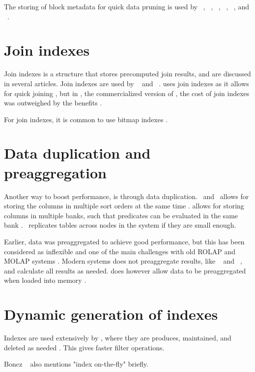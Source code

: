 The storing of block metadata for quick data pruning is used by \oracle~\cite{Lahiri2015-mz}, \ibm~\cite{Roman2013-em}, \vertica~\cite{Lamb2012-kg}, \monetx~\cite{Boncz2005-wj}, \mssql~\cite{Larson2013-mc}, and \exasol~\cite{Exasol2014-xh}.

\section{Join indexes}
\label{sec:Join indexes}
Join indexes is a structure that stores precomputed join results, and are discussed in several articles. Join indexes are used by \monetdb~\cite{Boncz2002-yj} and \monetx~\cite{Boncz2005-wj}.  \cstore uses join indexes as it allows for quick joining \cite{Stonebraker2005-qz}, but in \vertica, the commercialized version of \cstore, the cost of join indexes was outweighed by the benefits \cite{Lamb2012-kg}.

For join indexes, it is common to use bitmap indexes \cite{Bjorklund2011-wh}.

\section{Data duplication and preaggregation}
\label{sec:Data duplication and preaggregation}
Another way to boost performance, is through data duplication. \cstore~and \vertica~allows for storing the columns in multiple sort orders at the same time \cite{Stonebraker2005-qz, Lamb2012-kg}. \blink allows for storing columns in multiple banks, such that predicates can be evaluated in the same bank \cite{Johnson2008-cp}. \exasol~replicates tables across nodes in the system if they are small enough.

Earlier, data was preaggregated to achieve good performance, but this has been considered as inflexible and one of the main challenges with old ROLAP and MOLAP systems \cite{Boncz2002-yj}. Modern systems does not preaggregate results, like \sapnw~\cite{Lemke2010-is} and \qlikview~\cite{Qlik2014-vd}, and calculate all results as needed. \qlikview does however allow data to be preaggregated when loaded into memory \cite{Qlik2011-yc}.

\section{Dynamic generation of indexes}
\label{sec:Dynamic generation of indexes}
Indexes are used extensively by \exasol, where they are produces, maintained, and deleted as needed \cite{Exasol2014-xh}. This gives faster filter operations.

Boncz \ea~\cite{Boncz2006-md} also mentions "index on-the-fly" briefly.

